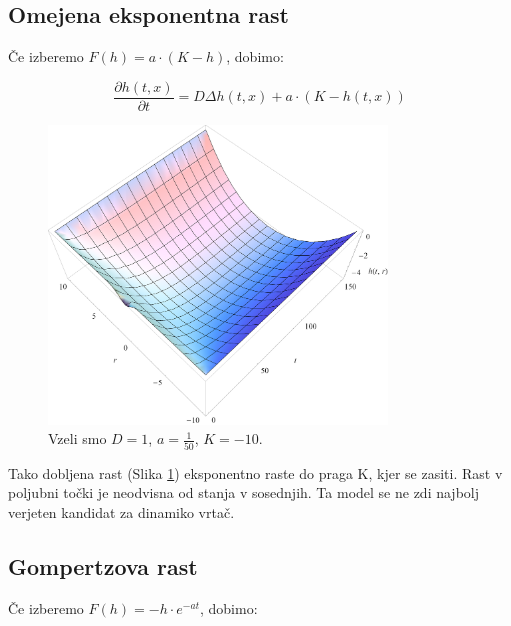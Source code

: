 \documentclass[a4paper, twoside, 12pt]{book}
\begin{document}
    \subsection{Omejena eksponentna rast}

    Če izberemo $F(h) = a \cdot (K - h)$, dobimo:

    \begin{equation}
      \frac{ \partial h(t,x) }{ \partial t} = D \Delta h(t,x) + a \cdot (K - h(t,x))
      \label{difuzija-omejena-eksponentna-rast}
    \end{equation}
    \begin{figure}[h]
      \begin{center}
        \includegraphics[width=9cm]{slike/difuzija-omejena-eksponentna-rast2}
      \end{center}
      \caption{Vzeli smo $D=1$, $a=\frac{1}{50}$, $K=-10$.}
      \label{fig:difuzija-omejena-eksponentna-rast}
    \end{figure}

    Tako dobljena rast (Slika \ref{fig:difuzija-omejena-eksponentna-rast}) eksponentno raste do praga K, kjer se zasiti. Rast v poljubni točki je neodvisna od stanja v sosednjih. Ta model se ne zdi najbolj verjeten kandidat za dinamiko vrtač.

    \subsection{Gompertzova rast}

    Če izberemo $F(h) = - h \cdot e^{-a t}$, dobimo:
\end{document}
